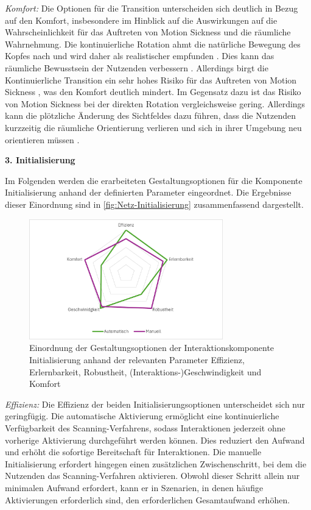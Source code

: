 \textit{Komfort:}
Die Optionen für die Transition unterscheiden sich deutlich in Bezug auf den Komfort, insbesondere im Hinblick auf die Auswirkungen auf die Wahrscheinlichkeit für das Auftreten von Motion Sickness und die räumliche Wahrnehmung.
Die kontinuierliche Rotation ahmt die natürliche Bewegung des Kopfes nach und wird daher als realistischer empfunden \citep{8797722}. Dies kann das räumliche Bewusstsein der Nutzenden verbessern \citep{10.1145/3441852.3471230}. Allerdings birgt die Kontinuierliche Transition ein sehr hohes Risiko für das Auftreten von Motion Sickness \citep{10.1007/s10055-020-00425-x, 8797722}, was den Komfort deutlich mindert.
Im Gegensatz dazu ist das Risiko von Motion Sickness bei der direkten Rotation vergleichsweise gering. Allerdings kann die plötzliche Änderung des Sichtfeldes dazu führen, dass die Nutzenden kurzzeitig die räumliche Orientierung verlieren und sich in ihrer Umgebung neu orientieren müssen \citep{10.1145/3441852.3471230}. 

\textbf{3. Initialisierung} 

Im Folgenden werden die erarbeiteten Gestaltungsoptionen für die Komponente Initialisierung anhand der definierten Parameter eingeordnet. Die Ergebnisse dieser Einordnung sind in \autoref{fig:Netz-Initialisierung} zusammenfassend dargestellt. 

\begin{figure}[tbh]
    \centering
    \includegraphics[width=0.75\textwidth]{images/Netzdiagramm-Initialisierung.png}
    \caption{Einordnung der Gestaltungsoptionen der Interaktionskomponente Initialisierung anhand der relevanten Parameter Effizienz, Erlernbarkeit, Robustheit, (Interaktions-)Geschwindigkeit und Komfort}
    \label{fig:Netz-Initialisierung}
\end{figure}

\textit{Effizienz:}
Die Effizienz der beiden Initialisierungsoptionen unterscheidet sich nur geringfügig. Die automatische Aktivierung ermöglicht eine kontinuierliche Verfügbarkeit des Scanning-Verfahrens, sodass Interaktionen jederzeit ohne vorherige Aktivierung durchgeführt werden können. Dies reduziert den Aufwand und erhöht die sofortige Bereitschaft für Interaktionen. Die manuelle Initialisierung erfordert hingegen einen zusätzlichen Zwischenschritt, bei dem die Nutzenden das Scanning-Verfahren aktivieren. Obwohl dieser Schritt allein nur minimalen Aufwand erfordert, kann er in Szenarien, in denen häufige Aktivierungen erforderlich sind, den erforderlichen Gesamtaufwand erhöhen. 

